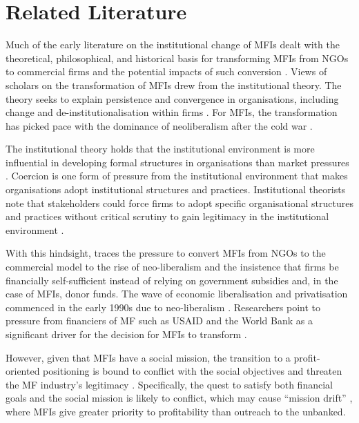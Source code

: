\documentclass[a4paper, nobind]{templates/ociamthesis}
\begin{document}
\hypertarget{related-literature}{%
\section{Related Literature}\label{related-literature}}

Much of the early literature on the institutional change of MFIs dealt with the theoretical, philosophical, and historical basis for transforming MFIs from NGOs to commercial firms and the potential impacts of such conversion \autocite{campion1999institutional,christen2001commercialization,gutierrez201920,zaby2019science}. Views of scholars on the transformation of MFIs drew from the institutional theory. The theory seeks to explain persistence and convergence in organisations, including change and de-institutionalisation within firms \autocite{scott2004institutional}. For MFIs, the transformation has picked pace with the dominance of neoliberalism after the cold war \autocite{ostry2017}.

The institutional theory holds that the institutional environment is more influential in developing formal structures in organisations than market pressures \autocite{maggio1991}. Coercion is one form of pressure from the institutional environment that makes organisations adopt institutional structures and practices. Institutional theorists note that stakeholders could force firms to adopt specific organisational structures and practices without critical scrutiny to gain legitimacy in the institutional environment \autocite{scott2004institutional,martinez2017coercive}.

With this hindsight, \textcite{bateman2010doesn} traces the pressure to convert MFIs from NGOs to the commercial model to the rise of neo-liberalism and the insistence that firms be financially self-sufficient instead of relying on government subsidies and, in the case of MFIs, donor funds. The wave of economic liberalisation and privatisation commenced in the early 1990s due to neo-liberalism \autocite{silva1998neoliberalism}. Researchers point to pressure from financiers of MF such as USAID and the World Bank as a significant driver for the decision for MFIs to transform \autocite{ostry2017}.

However, given that MFIs have a social mission, the transition to a profit-oriented positioning is bound to conflict with the social objectives and threaten the MF industry's legitimacy \autocite{ramus2017,nason2018behavioral}. Specifically, the quest to satisfy both financial goals and the social mission is likely to conflict, which may cause ``mission drift'' \autocite{mersland2010microfinance,mia2017mission}, where MFIs give greater priority to profitability than outreach to the unbanked.
\end{document}
